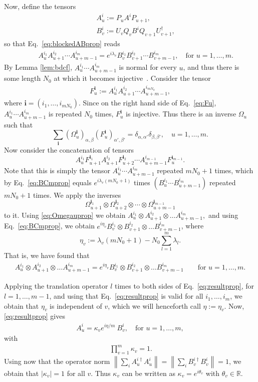 \documentclass[pra,a4paper,notitlepage,nofootinbib,superscriptaddress]{revtex4-1}
\theoremstyle{plain}
\newcommand{\1}{{\openone}}
\newcommand{\be}{\begin{eqnarray}}
\newcommand{\ee}{\end{eqnarray}}
\begin{document}
Now, define the tensors
\be
    &&A^i_u := P_u A^{i} P_{u+1}, \label{eq:Auprop}\\
    &&B_{v}^i := U_v  Q_v B^{i} Q_{v+1} U_{v+1}^{\dagger},  \label{eq:Cvprop}
\ee
so that Eq.\ \eqref{eq:blockedABprop} reads
\be \label{eq:BCmprop}
    &&A_u^{i_1}A_{u+1}^{i_2}\cdots A_{u+m-1}^{i_m} =
    e^{i\lambda_{v}}
    B_{v}^{i_1} B_{v+1}^{i_2}\cdots B_{v+m-1}^{i_m}, \quad  \textrm{for } u=1,\ldots, m.
\ee
By Lemma \ref{lem:bdcf}, $A_u^{i_1}\cdots A_{u+m-1}^{i_m}$  is normal for every $u$, and
thus there is some length $N_0$ at which it becomes injective~\cite{Ci15}.
Consider the tensor
\be
    F_u^\mathbf{i} :=
    A_u^{i_1}A_{u+1}^{i_2}\cdots A_{u+m-1}^{i_{mN_0}} ,
    \label{eq:Fu}
\ee
where $\mathbf{i}=(i_1,\dots,i_{mN_0})$. Since on the right hand side of
Eq.~\eqref{eq:Fu}, $A_u^{i_1}\cdots A_{u+m-1}^{i_m}$ is repeated $N_0$
times, $F_u^\mathbf{i}$ is injective. Thus there is an inverse
$\Omega_u$ such that
\begin{equation}
    \sum_{\mathbf{i}} (\Omega_u^\mathbf{i})_{\alpha,\beta}
    (F_u^\mathbf{i})_{\alpha',\beta'} =
    \delta_{\alpha,\alpha'}\delta_{\beta,\beta'}, \quad u=1,\ldots, m.
    \label{eq:Omegauprop}
\end{equation}
Now consider the concatenation of tensors
$$
    A_u^{i_1} F_{u+1}^{\mathbf{i}_1} A_{u+1}^{i_2} F_{u+2}^{\mathbf{i}_2} \cdots A_{u+m-1}^{i_{m-1}} F_{u}^{\mathbf{i}_{m-1}}.
$$
Note that this is simply the tensor $A^{i_1}_u\cdots A^{i_m}_{u+m-1}$
repeated $mN_0+1$ times, which by Eq.\ \eqref{eq:BCmprop} equals
$e^{i\lambda_v(mN_0+1)}$ times $(B^{i_1}_u\cdots B^{i_m}_{u+m-1})$
repeated $mN_0+1$ times.  We apply the inverses
$$
    \Omega_{u+1}^{ \mathbf{i}_1}\otimes \Omega_{u+2}^{ \mathbf{i}_2} \otimes
    \cdots \otimes \Omega_{u+m-1}^{ \mathbf{i}_{m-1}}
$$
to it. Using \eqref{eq:Omegauprop} we obtain
$A_u^{i_1}\otimes A_{u+1}^{i_2}\otimes \ldots  A_{u+m-1}^{i_m},$ and using
Eq.\ \eqref{eq:BCmprop}, we obtain
$e^{i\eta_v}
    B_v^{i_1}\otimes B_{v+1}^{i_2}\otimes \ldots  B_{v+m-1}^{i_m} $,
where
$$
    \eta_v := \lambda_v (mN_0+1) - N_0\sum_{l=1}^m \lambda_l.
$$
That is, we have found that
\be
    A_u^{i_1}\otimes A_{u+1}^{i_2} \otimes \ldots  A_{u+m-1}^{i_m}
    =
    e^{i\eta_v} B_{v}^{i_1}\otimes  B_{v+1}^{i_2}  \otimes \ldots  B_{v+m-1}^{i_m}  \qquad \textrm{for } u=1,\ldots, m .
    \label{eq:resultprop}
\ee

Applying  the translation operator $l$ times to  both sides of Eq.\ \eqref{eq:resultprop}, for $l=1,\ldots, m-1$, and using that Eq.\ \eqref{eq:resultprop} is valid for all $i_1,\ldots, i_m$, we obtain that $\eta_v$ is independent of $v$,
which we will henceforth call  $\eta:=\eta_v$.
Now, \eqref{eq:resultprop} gives
\be
    A_{u}^{i} = \kappa_v  e^{i\eta/m}  \: B_{v}^{i} , \quad \textrm{for }u=1,\ldots, m,
    \label{eq:thetaACprop}
\ee
with
\be
    \: \prod_{v=1}^{m} \kappa_v = 1.
    \label{eq:prodkappaprop}
\ee
Using now that the operator norm $\left\|\sum_i A_u^{i \dagger} A_u^i\right\|=
    \left\|\sum_i B_v^{i \dagger} B_v^i\right\|=1$, we obtain that  $|\kappa_v|=1$ for all $v$.  Thus $\kappa_v$ can be written as $\kappa_v = e^{i\theta_v} $
with $\theta_v\in \mathbb{R}$.
\end{document}
